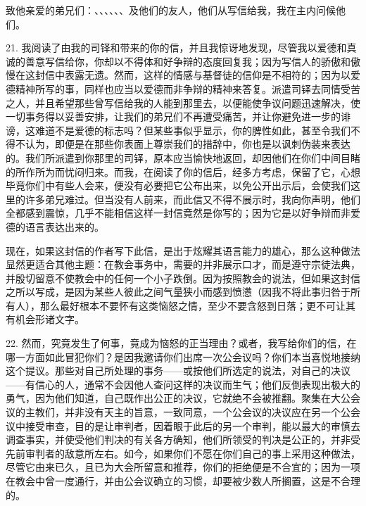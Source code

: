 \par

致他亲爱的弟兄们：、、、、、、及他们的友人，他们从写信给我，我在主内问候他们。\par

21. 我阅读了由我的司铎和带来的你的信，并且我惊讶地发现，尽管我以爱德和真诚的善意写信给你，你却以不得体和好争辩的态度回复我；因为写信人的骄傲和傲慢在这封信中表露无遗。然而，这样的情感与基督徒的信仰是不相符的；因为以爱德精神所写的事，同样也应当以爱德而非争辩的精神来答复。派遣司铎去同情受苦之人，并且希望那些曾写信给我的人能到那里去，以便能使争议问题迅速解决，使一切事务得以妥善安排，让我们的弟兄们不再遭受痛苦，并让你避免进一步的诽谤，这难道不是爱德的标志吗？但某些事似乎显示，你的脾性如此，甚至令我们不得不认为，即便是在那些你表面上尊崇我们的措辞中，你也是以讽刺伪装来表达的。我们所派遣到你那里的司铎，原本应当愉快地返回，却因他们在你们中间目睹的所作所为而忧闷归来。而我，在阅读了你的信后，经多方考虑，保留了它，心想毕竟你们中有些人会来，便没有必要把它公布出来，以免公开出示后，会使我们这里的许多弟兄难过。但当没有人前来，而此信又不得不展示时，我向你声明，他们全都感到震惊，几乎不能相信这样一封信竟然是你写的；因为它是以好争辩而非爱德的语言表达出来的。\par

现在，如果这封信的作者写下此信，是出于炫耀其语言能力的雄心，那么这种做法显然更适合其他主题：在教会事务中，需要的并非展示口才，而是遵守宗徒法典，并殷切留意不使教会中的任何一个小子跌倒。因为按照教会的说法，但如果这封信之所以写成，是因为某些人彼此之间气量狭小而感到愤懑（因我不将此事归咎于所有人），那么最好根本不要怀有这类恼怒之情，至少不要含怒到日落；更不可让其有机会形诸文字。\par

22. 然而，究竟发生了何事，竟成为恼怒的正当理由？或者，我写给你们的信，在哪一方面如此冒犯你们？是因我邀请你们出席一次公会议吗？你们本当喜悦地接纳这个提议。那些对自己所处理的事务——或按他们所选定的说法，对自己的决议——有信心的人，通常不会因他人查问这样的决议而生气；他们反倒表现出极大的勇气，因为他们知道，自己既作出公正的决议，它就绝不会被推翻。聚集在大公会议的主教们，并非没有天主的旨意，一致同意，一个公会议的决议应在另一个公会议中接受审查，目的是让审判者，因着眼于此后的另一个审判，能以最大的审慎去调查事实，并使受他们判决的有关各方确知，他们所领受的判决是公正的，并非受先前审判者的敌意所左右。如今，如果你们不愿在你们自己的事上采用这种做法，尽管它由来已久，且已为大会所留意和推荐，你们的拒绝便是不合宜的；因为一项在教会中曾一度通行，并由公会议确立的习惯，却要被少数人所搁置，这是不合理的。\par

